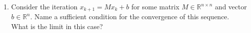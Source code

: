 \begin{enumerate}
	\item Consider the iteration $x_{k+1} = Mx_k + b$ for some matrix $M \in \mathbb{R}^{n \times n}$ and vector $b \in \mathbb{R}^n$. Name a sufficient condition for the convergence of this sequence. What is the limit in this case? 

\end{enumerate}
 